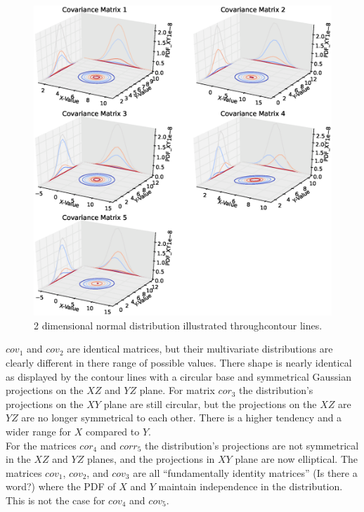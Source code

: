 \begin{figure}[H] 
	\centering 
	\includegraphics[width=\linewidth]{figure_3}
	\caption{2 dimensional normal distribution illustrated throughcontour lines.}
	\label{fig: 2dnc} 
\end{figure}

$cov_1$ and $cov_2$ are identical matrices, but their multivariate distributions are clearly different in there range of possible values. There shape is nearly identical as displayed by the contour lines with a circular base and symmetrical Gaussian projections on the $XZ$ and $YZ$ plane. For matrix $cor_3$ the distribution's projections on the $XY$ plane are still circular, but the projections on the $XZ$ are $YZ$ are no longer symmetrical to each other. There is a higher tendency and a wider range for $X$ compared to $Y$.   \\

For the matrices $cor_4$ and $corr_5$ the distribution's projections are not symmetrical in the $XZ$ and $YZ$ planes, and the projections in $XY$ plane are now elliptical. The matrices $cov_1$, $cov_2$, and $cov_3$ are all ``fundamentally identity matrices'' (Is there a word?) where the PDF of $X$ and $Y$ maintain independence in the distribution. This is not the case for $cov_4$ and $cov_5$. 
 
